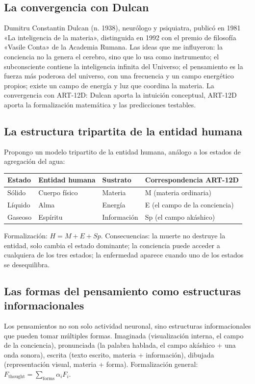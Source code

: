 \subsection{La convergencia con Dulcan}
Dumitru Constantin Dulcan (n. 1938), neurólogo y psiquiatra, publicó en 1981 «La inteligencia de la materia», distinguida en 1992 con el premio de filosofía «Vasile Conta» de la Academia Rumana. Las ideas que me influyeron: la conciencia no la genera el cerebro, sino que lo usa como instrumento; el subconsciente contiene la inteligencia infinita del Universo; el pensamiento es la fuerza más poderosa del universo, con una frecuencia y un campo energético propios; existe un campo de energía y luz que coordina la materia. La convergencia con ART-12D: Dulcan aporta la intuición conceptual, ART-12D aporta la formalización matemática y las predicciones testables.

\subsection{La estructura tripartita de la entidad humana}
Propongo un modelo tripartito de la entidad humana, análogo a los estados de agregación del agua:
\begin{table}[H]
\centering
\begin{tabular}{@{}llll@{}}
\toprule
\textbf{Estado} & \textbf{Entidad humana} & \textbf{Sustrato} & \textbf{Correspondencia ART-12D} \\ \midrule
Sólido & Cuerpo físico & Materia & M (materia ordinaria) \\
Líquido & Alma & Energía & E (el campo de la conciencia) \\
Gaseoso & Espíritu & Información & Sp (el campo akáshico) \\ \bottomrule
\end{tabular}
\end{table}
Formalización: $H = M + E + Sp$. Consecuencias: la muerte no destruye la entidad, solo cambia el estado dominante; la conciencia puede acceder a cualquiera de los tres estados; la enfermedad aparece cuando uno de los estados se desequilibra.

\subsection{Las formas del pensamiento como estructuras informacionales}
Los pensamientos no son solo actividad neuronal, sino estructuras informacionales que pueden tomar múltiples formas. Imaginada (visualización interna, el campo de la conciencia), pronunciada (la palabra hablada, el campo akáshico + una onda sonora), escrita (texto escrito, materia + información), dibujada (representación visual, materia + forma). Formalización general: $F_{\text{thought}} = \sum_{\text{forms}} \alpha_i F_i$.

